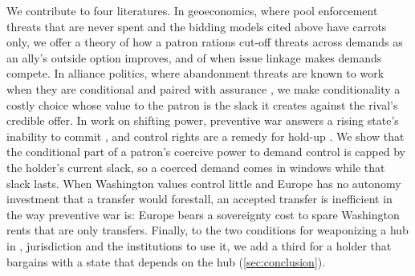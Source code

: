 We contribute to four literatures. In geoeconomics, where \citet{clayton2026framework} pool enforcement threats that are never spent and the bidding models cited above have carrots only, we offer a theory of how a patron rations cut-off threats across demands as an ally's outside option improves, and of when issue linkage makes demands compete. In alliance politics, where abandonment threats are known to work when they are conditional and paired with assurance \citep{gerzhoy2015alliance, blankenship2023burden}, we make conditionality a costly choice whose value to the patron is the slack it creates against the rival's credible offer. In work on shifting power, preventive war answers a rising state's inability to commit \citep{fearon1995rationalist, powell2006war, krainin2017preventive, debs2014known}, and control rights are a remedy for hold-up \citep{grossman1986costs, lake1996anarchy, cooley2009contracting}. We show that the conditional part of a patron's coercive power to demand control is capped by the holder's current slack, so a coerced demand comes in windows while that slack lasts. When Washington values control little and Europe has no autonomy investment that a transfer would forestall, an accepted transfer is inefficient in the way preventive war is: Europe bears a sovereignty cost to spare Washington rents that are only transfers. Finally, to the two conditions for weaponizing a hub in \citet{farrell2019weaponized}, jurisdiction and the institutions to use it, we add a third for a holder that bargains with a state that depends on the hub (\cref{sec:conclusion}).
